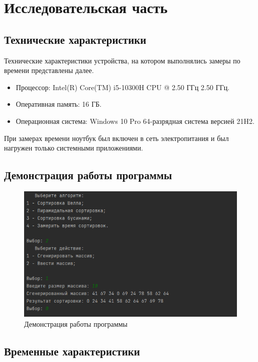 \chapter{Исследовательская часть}

\section{Технические характеристики}

Технические характеристики устройства, на котором выполнялись замеры по времени представлены далее.

\begin{itemize}
	\item Процессор: Intel(R) Core(TM) i5-10300H CPU @ 2.50 ГГц 2.50 ГГц. \cite{intel}
	\item Оперативная память: 16 ГБ.
	\item Операционная система: Windows 10 Pro 64-разрядная система версией 21H2. \cite{windows}
\end{itemize}

При замерах времени ноутбук был включен в сеть электропитания и был нагружен только системными приложениями.

\section{Демонстрация работы программы}

\begin{figure}[h]
	\centering
	\includegraphics[height=0.35\textheight]{img/example.png}
	\caption{Демонстрация работы программы}
	\label{img:demonstration}
\end{figure}

\clearpage

\section{Временные характеристики}


